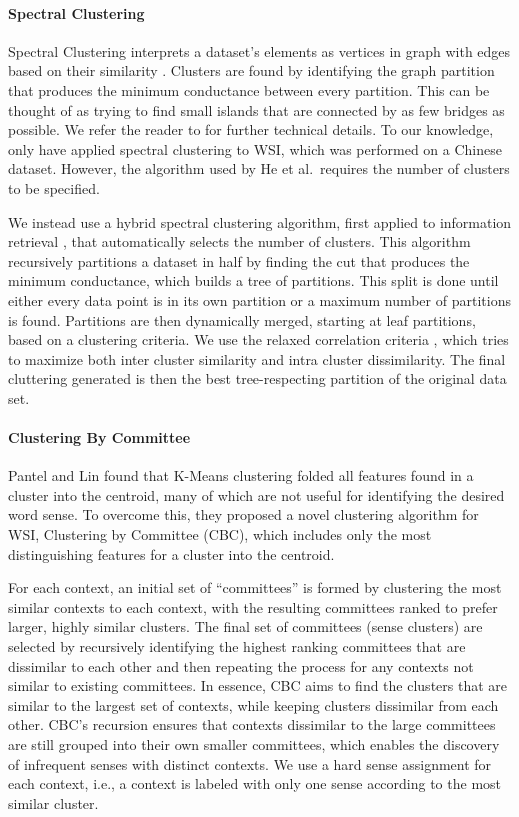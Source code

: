 \documentclass[11pt]{article}
\begin{document}
\paragraph{Spectral Clustering}
%
Spectral Clustering interprets a dataset's elements as vertices in graph with
edges based on their similarity \cite{ng01spectral}.  Clusters are found by
identifying the graph partition that produces the minimum conductance between
every partition.  This can be thought of as trying to find small islands that
are connected by as few bridges as possible.  We refer the reader to
\cite{von07tutorial} for further technical details. To our knowledge, only
 have applied spectral clustering to WSI, which was
performed on a Chinese dataset.  However, the algorithm used by He et
al.\ requires the number of clusters to be specified.

We instead use a hybrid spectral clustering algorithm, first applied to
information retrieval \cite{cheng06divide}, that automatically selects the
number of clusters.  This algorithm recursively partitions a dataset in half by
finding the cut that produces the minimum conductance, which builds a tree of
partitions.  This split is done until either every data point is in its own
partition or a maximum number of partitions is found.  Partitions are then
dynamically merged, starting at leaf partitions, based on a clustering criteria.
We use the relaxed correlation criteria \cite{cheng06divide},
which tries to maximize both inter cluster similarity and intra cluster
dissimilarity.  The final cluttering generated is then the best tree-respecting
partition of the original data set.

\paragraph{Clustering By Committee}
Pantel and Lin  found that K-Means clustering
folded all features found in a cluster into the centroid, many of which are not
useful for identifying the desired word sense.  To overcome this, they proposed
a novel clustering algorithm for WSI, Clustering by Committee (CBC), which
includes only the most distinguishing features for a cluster into the centroid.

For each context, an initial set of ``committees'' is formed by clustering the
most similar contexts to each context, with the resulting committees ranked to
prefer larger, highly similar clusters.  The final set of committees (sense
clusters) are selected by recursively identifying the highest ranking committees
that are dissimilar to each other and then repeating the process for any
contexts not similar to existing committees.  In essence, CBC aims to find the
clusters that are similar to the largest set of contexts, while keeping clusters
dissimilar from each other.  CBC's recursion ensures that contexts dissimilar to
the large committees are still grouped into their own smaller committees, which
enables the discovery of infrequent senses with distinct contexts.  We use a
hard sense assignment for each context, i.e., a context is labeled with only one
sense according to the most similar cluster.
\end{document}
